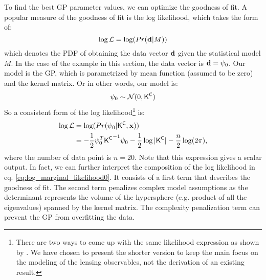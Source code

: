 To find the best GP parameter values, we can optimize 
the goodness of fit. A popular measure of the goodness of fit is
the log likelihood, which takes the form of:
\begin{equation}
	\log \mathcal{L} = \log(Pr({\bf d} | M))
\end{equation}
which denotes the PDF of obtaining the data vector ${\bf d}$ given the
statistical model $M$. 
In the case of the example in this section, the data vector is ${\bf d} =
\psi_0$. Our model is the GP, which is parametrized by mean
function (assumed to be zero) and the kernel matrix. 
Or in other words, our model is:
\begin{equation}
	\psi_0 \sim \mathcal{N}(0, \mathsf{K}^{\mathsf{C}})
\end{equation}
So a consistent form of the log
likelihood\footnote{There are two ways to come up with the same likelihood
	expression as shown by \cite{Rasmussen2006}. We have chosen to present the
	 shorter version to keep the main focus on the modeling of the lensing observables, not
	 the derivation of an existing result.} \citep{Rasmussen2006} is: \\
\begin{align}
	\log \mathcal{L} &= \log (Pr(\psi_0 | \mathsf{K}^{\mathsf{C}}, \mathbf{x}))\\
	&=  -\frac{1}{2}\psi_0^T {\mathsf{K}^{\mathsf{C}}}^{-1}\psi_0
	- \frac{1}{2}\log|\mathsf{K}^{\mathsf{C}}| - \frac{n}{2}\log(2\pi),
	\label{eq:log_marginal_likelihood0}
\end{align}
where the number of data point is $n=20$. Note that this expression gives a scalar output.
In fact, we can further interpret the composition of the log likelihood in 
eq. \ref{eq:log_marginal_likelihood0}. It
consists of a first term that describes the goodness of fit.
The second term penalizes complex model assumptions \citep{Rasmussen2006} 
as the determinant represents the volume of the hypersphere (e.g. product of
all the eigenvalues) spanned by the kernel matrix. 
The complexity penalization term can prevent the GP from overfitting the data.


